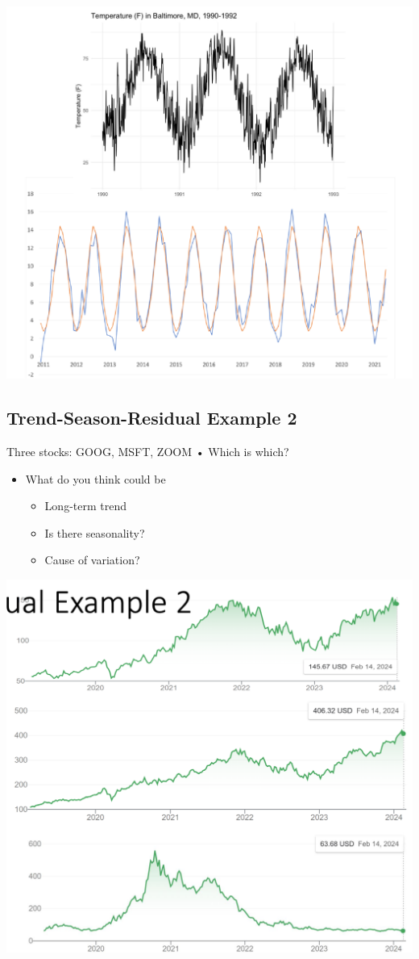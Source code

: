 \documentclass[11pt]{article}
\theoremstyle{definition}
\begin{document}
\includegraphics[width=\textwidth]{3.png}

\subsection{Trend-Season-Residual Example 2}
Three stocks: GOOG,
MSFT, ZOOM
• Which is which?

\begin{itemize}
  \item What do you think
  could be
  \begin{itemize}
    \item Long-term trend
    \item Is there seasonality?
    \item Cause of variation?
  \end{itemize}
\end{itemize}

\includegraphics[width=\textwidth/4]{4.png}
\end{document}

